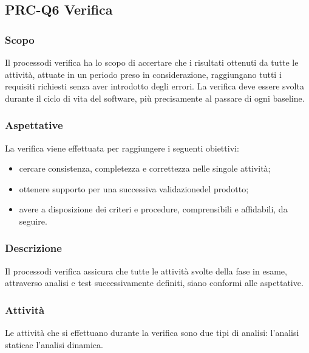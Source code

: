 \subsection{PRC-Q6 Verifica}
\subsubsection{Scopo}
Il processo\glosp di verifica ha lo scopo di accertare che i risultati ottenuti da tutte le attività, attuate in un periodo preso in considerazione, raggiungano tutti i requisiti richiesti senza aver introdotto degli errori. La verifica deve essere svolta durante il ciclo di vita del software, più precisamente al passare di ogni baseline\glo.
\subsubsection{Aspettative}
La verifica viene effettuata per raggiungere i seguenti obiettivi:
\begin{itemize}
	\item cercare consistenza, completezza e correttezza nelle singole attività;
	\item ottenere supporto per una successiva validazione\glosp del prodotto\glo;
	\item avere a disposizione dei criteri e procedure, comprensibili e affidabili, da seguire.
\end{itemize}
\subsubsection{Descrizione}
Il processo\glosp di verifica assicura che tutte le attività svolte della fase in esame, attraverso analisi e test successivamente definiti, siano conformi alle aspettative.
\subsubsection{Attività}
Le attività che si effettuano durante la verifica sono due tipi di analisi: l'analisi statica\glosp e l'analisi dinamica. \\[2mm]
